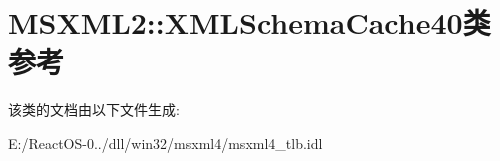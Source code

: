 \hypertarget{class_m_s_x_m_l2_1_1_x_m_l_schema_cache40}{}\section{M\+S\+X\+M\+L2\+:\+:X\+M\+L\+Schema\+Cache40类 参考}
\label{class_m_s_x_m_l2_1_1_x_m_l_schema_cache40}


该类的文档由以下文件生成\+:\begin{DoxyCompactItemize}
\item 
E\+:/\+React\+O\+S-\/0../dll/win32/msxml4/msxml4\+\_\+tlb.\+idl\end{DoxyCompactItemize}
